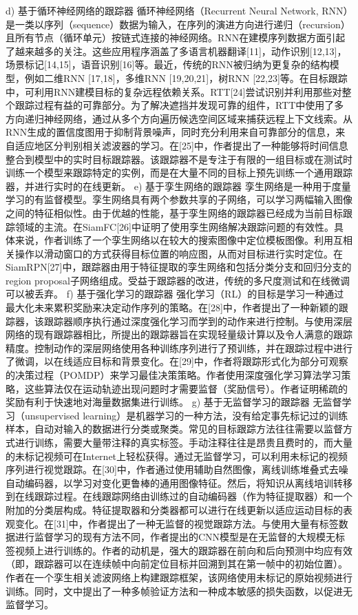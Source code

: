 d)	基于循环神经网络的跟踪器
循环神经网络（Recurrent Neural Network, RNN）是一类以序列（sequence）数据为输入，在序列的演进方向进行递归（recursion）且所有节点（循环单元）按链式连接的神经网络。RNN在建模序列数据方面引起了越来越多的关注。这些应用程序涵盖了多语言机器翻译[11]，动作识别[12,13]，场景标记[14,15]，语音识别[16]等。最近，传统的RNN被归纳为更复杂的结构模型，例如二维RNN [17,18]，多维RNN [19,20,21]，树RNN [22,23]等。在目标跟踪中，可利用RNN建模目标的复杂远程依赖关系。RTT[24]尝试识别并利用那些对整个跟踪过程有益的可靠部分。为了解决遮挡并发现可靠的组件，RTT中使用了多方向递归神经网络，通过从多个方向遍历候选空间区域来捕获远程上下文线索。从RNN生成的置信度图用于抑制背景噪声，同时充分利用来自可靠部分的信息，来自适应地区分判别相关滤波器的学习。在[25]中，作者提出了一种能够将时间信息整合到模型中的实时目标跟踪器。该跟踪器不是专注于有限的一组目标或在测试时训练一个模型来跟踪特定的实例，而是在大量不同的目标上预先训练一个通用跟踪器，并进行实时的在线更新。
e)	基于孪生网络的跟踪器
孪生网络是一种用于度量学习的有监督模型。孪生网络具有两个参数共享的子网络，可以学习两幅输入图像之间的特征相似性。由于优越的性能，基于孪生网络的跟踪器已经成为当前目标跟踪领域的主流。在SiamFC[26]中证明了使用孪生网络解决跟踪问题的有效性。具体来说，作者训练了一个孪生网络以在较大的搜索图像中定位模板图像。利用互相关操作以滑动窗口的方式获得目标位置的响应图，从而对目标进行实时定位。在SiamRPN[27]中，跟踪器由用于特征提取的孪生网络和包括分类分支和回归分支的region proposal子网络组成。受益于跟踪器的改进，传统的多尺度测试和在线微调可以被丢弃。
f)	基于强化学习的跟踪器
强化学习（RL）的目标是学习一种通过最大化未来累积奖励来决定动作序列的策略。在[28]中，作者提出了一种新颖的跟踪器，该跟踪器顺序执行通过深度强化学习而学到的动作来进行控制。与使用深层网络的现有跟踪器相比，所提出的跟踪器旨在实现轻量级计算以及令人满意的跟踪精度。控制动作的深层网络使用各种训练序列进行了预训练，并在跟踪过程中进行了微调，以在线适应目标和背景变化。在[29]中，作者将跟踪形式化为部分可观察的决策过程（POMDP）来学习最佳决策策略。作者使用深度强化学习算法学习策略，这些算法仅在运动轨迹出现问题时才需要监督（奖励信号）。作者证明稀疏的奖励有利于快速地对海量数据集进行训练。
g)	基于无监督学习的跟踪器
无监督学习（unsupervised learning）是机器学习的一种方法，没有给定事先标记过的训练样本，自动对输入的数据进行分类或聚类。常见的目标跟踪方法往往需要以监督方式进行训练，需要大量带注释的真实标签。手动注释往往是昂贵且费时的，而大量的未标记视频可在Internet上轻松获得。通过无监督学习，可以利用未标记的视频序列进行视觉跟踪。在[30]中，作者通过使用辅助自然图像，离线训练堆叠式去噪自动编码器，以学习对变化更鲁棒的通用图像特征。然后，将知识从离线培训转移到在线跟踪过程。在线跟踪网络由训练过的自动编码器（作为特征提取器）和一个附加的分类层构成。特征提取器和分类器都可以进行在线更新以适应运动目标的表观变化。在[31]中，作者提出了一种无监督的视觉跟踪方法。与使用大量有标签数据进行监督学习的现有方法不同，作者提出的CNN模型是在无监督的大规模无标签视频上进行训练的。作者的动机是，强大的跟踪器在前向和后向预测中均应有效（即，跟踪器可以在连续帧中向前定位目标并回溯到其在第一帧中的初始位置）。作者在一个孪生相关滤波网络上构建跟踪框架，该网络使用未标记的原始视频进行训练。同时，文中提出了一种多帧验证方法和一种成本敏感的损失函数，以促进无监督学习。
